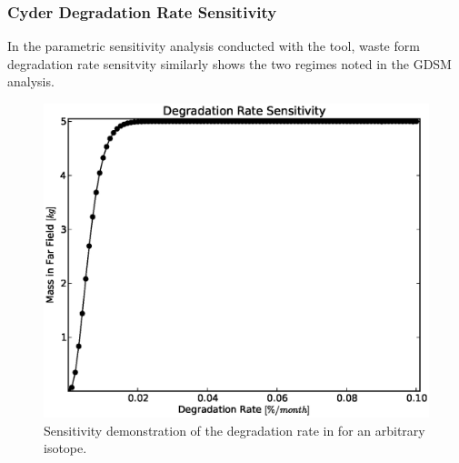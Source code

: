 \begin{frame}[ctb]
\frametitle{Cyder Degradation Rate Sensitivity}
In the parametric sensitivity analysis conducted with the \Cyder tool, waste 
form degradation rate sensitvity similarly shows the two regimes noted in the 
GDSM analysis.  


\begin{figure}[htbp!]
\begin{center}
\includegraphics[width=0.7\linewidth]{./nuclide_demonstration/deg.eps}
\end{center}
\caption{Sensitivity demonstration of the degradation rate in \Cyder for an 
arbitrary isotope.}
\label{fig:deg}
\end{figure}
\end{frame}
